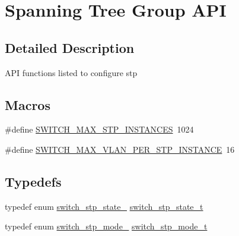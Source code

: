 \hypertarget{group__stp}{\section{Spanning Tree Group A\+P\+I}
\label{group__stp}
}


\subsection{Detailed Description}
A\+P\+I functions listed to configure stp \subsection*{Macros}
\begin{DoxyCompactItemize}
\item 
\#define \hyperlink{group__stp_ga7d82d13b8bc0f41d1c736b3aadecff25}{S\+W\+I\+T\+C\+H\+\_\+\+M\+A\+X\+\_\+\+S\+T\+P\+\_\+\+I\+N\+S\+T\+A\+N\+C\+E\+S}~1024
\item 
\#define \hyperlink{group__stp_ga3cb957033a58fe3de452dcaa6d49f2de}{S\+W\+I\+T\+C\+H\+\_\+\+M\+A\+X\+\_\+\+V\+L\+A\+N\+\_\+\+P\+E\+R\+\_\+\+S\+T\+P\+\_\+\+I\+N\+S\+T\+A\+N\+C\+E}~16
\end{DoxyCompactItemize}
\subsection*{Typedefs}
\begin{DoxyCompactItemize}
\item 
typedef enum \hyperlink{group__stp_ga6581381a1b134b4d8fe0f963addec7b5}{switch\+\_\+stp\+\_\+state\+\_\+} \hyperlink{group__stp_ga487b2b1cdeaa476047d2022273f58a56}{switch\+\_\+stp\+\_\+state\+\_\+t}
\item 
typedef enum \hyperlink{group__stp_ga8f4ad089a2dadfd52729fb2023e53498}{switch\+\_\+stp\+\_\+mode\+\_\+} \hyperlink{group__stp_ga035989f5b66364811135ccdf18d03e9b}{switch\+\_\+stp\+\_\+mode\+\_\+t}
\end{DoxyCompactItemize}
